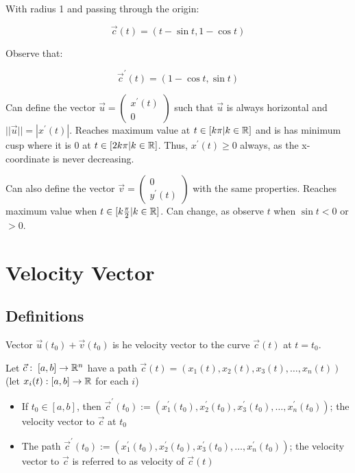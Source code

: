 With radius 1 and passing through the origin:

\[\vec{c}(t)=(t-\sin t, 1 - \cos t)\]

Observe that:

\[\vec{c}^\prime(t)=(1-\cos t, \sin t)\]

Can define the vector $\vec{u}=\left(\begin{array}{c}x^{\prime}(t) \\0\end{array}\right)$
such that $\vec{u}$ is always horizontal and $||\vec{u}||=|x^\prime(t)|$. Reaches maximum
value at $t\in[k\pi|k\in\mathbb{R}]$ and is has minimum cusp where it is 0 at $t\in [2k\pi|k\in\mathbb{R}]$.
Thus, $x^\prime(t)\geq 0$ always, as the x-coordinate is never decreasing. \newline

\noindent
Can also define the vector $\vec{v}=\left(\begin{array}{c}0 \\y^{\prime}(t)\end{array}\right)$
with the same properties. Reaches maximum value when $t\in[k\frac{\pi}{2}|k\in\mathbb{R}]$.
Can change, as observe $t$ when $\sin t < 0$ or $ >0 $.

\section{Velocity Vector}

\subsection{Definitions}

Vector $\vec{u}(t_0)+\vec{v}(t_0)$ is he velocity vector to the curve $\vec{c}(t)$ at $t=t_0$.\newline

\noindent
Let $\vec{c}:\;[a,b]\rightarrow \mathbb{R}^n$ have a path $\vec{c}(t)=\left(x_{1}(t), x_{2}(t), x_{3}(t), \ldots, x_{n}(t)\right)$ (let $x_i(t):[a,b]\rightarrow \mathbb{R}$ for each $i$)
\begin{itemize}
    \item If $t_0\in[a,b]$, then $\vec{c}^{\prime}\left(t_{0}\right):=\left(x_{1}^{\prime}\left(t_{0}\right), x_{2}^{\prime}\left(t_{0}\right), x_{3}^{\prime}\left(t_{0}\right), \ldots, x_{n}^{\prime}\left(t_{0}\right)\right)$; the velocity vector to $\vec{c}$ at $t_0$
    \item The path $\vec{c}^{\prime}\left(t_{0}\right):=\left(x_{1}^{\prime}\left(t_{0}\right), x_{2}^{\prime}\left(t_{0}\right), x_{3}^{\prime}\left(t_{0}\right), \ldots, x_{n}^{\prime}\left(t_{0}\right)\right)$; the velocity vector to $\vec{c}$ is referred to as velocity of $\vec{c}(t)$
\end{itemize}

